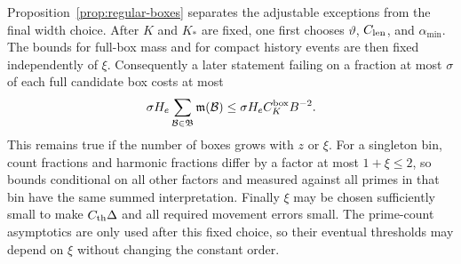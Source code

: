\begin{remark}\label{rem:boxes-order-and-sums}
Proposition~\ref{prop:regular-boxes} separates the adjustable
exceptions from the final width choice.  After $K$ and $K_*$ are
fixed, one first chooses $\vartheta$, $C_{\rm len}$, and
$\alpha_{\min}$.  The bounds for full-box mass and for compact
history events are then fixed independently of $\xi$.
Consequently a later statement failing on a fraction at most
$\sigma$ of each full candidate box costs at most
\[
 \sigma H_e\sum_{\mathcal B\in\mathfrak B}
                      \mathfrak m(\mathcal B)
 \le\sigma H_e C_K^{\rm box}B^{-2}.
\]
This remains true if the number of boxes grows with $z$ or $\xi$.
For a singleton bin, count fractions and harmonic fractions
differ by a factor at most $1+\xi\le2$, so bounds conditional on
all other factors and measured against all primes in that bin
have the same summed interpretation.  Finally $\xi$ may be
chosen sufficiently small to make $C_{\rm th}\Delta$ and all
required movement errors small.  The prime-count asymptotics
are only used after this fixed choice, so their eventual
thresholds may depend on $\xi$ without changing the constant
order.
\end{remark}
